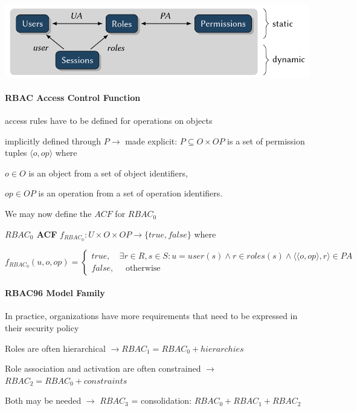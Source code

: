 \documentclass[a4paper]{article}
\renewcommand{\note}[2]{\begin{noteBox} \textbf{#1} #2 \end{noteBox}}
\begin{document}
\begin{multicols}{3}
    \includegraphics[width=.5\linewidth]{Assets/Systemsicherheit-rbac-0.png}

    \paragraph{RBAC Access Control Function}
    \begin{itemize*}
        \item access rules have to be defined for operations on objects
        \item implicitly defined through $P\rightarrow$ made explicit: $P\subseteq O\times OP$ is a set of permission tuples $\langle o,op\rangle$ where
        \begin{itemize*}
            \item $o\in O$ is an object from a set of object identifiers,
            \item $op\in OP$ is an operation from a set of operation identifiers.
        \end{itemize*}
        \item We may now define the $ACF$ for $RBAC_0$
    \end{itemize*}

    \note{$RBAC_0$ ACF}{
        $f_{RBAC_0}:U \times O\times OP\rightarrow\{true,false\}$ where

        $f_{RBAC_0} (u,o,op)= \begin{cases} true, \quad \exists r\in R,s\in S:u=user(s)\wedge r\in roles(s)\wedge \langle \langle o,op\rangle ,r\rangle \in PA \\ false, \quad\text{ otherwise } \end{cases}$
    }

    \paragraph{RBAC96 Model Family}
    In practice, organizations have more requirements that need to be expressed in their security policy
    \begin{itemize*}
        \item Roles are often hierarchical $\rightarrow RBAC_1 = RBAC_0 + hierarchies$
        \item Role association and activation are often constrained $\rightarrow$ $RBAC_2 = RBAC_0 + constraints$
        \item Both may be needed $\rightarrow$ $RBAC_3$ = consolidation: $RBAC_0 + RBAC_1 + RBAC_2$
    \end{itemize*}


\end{multicols}
\end{document}
